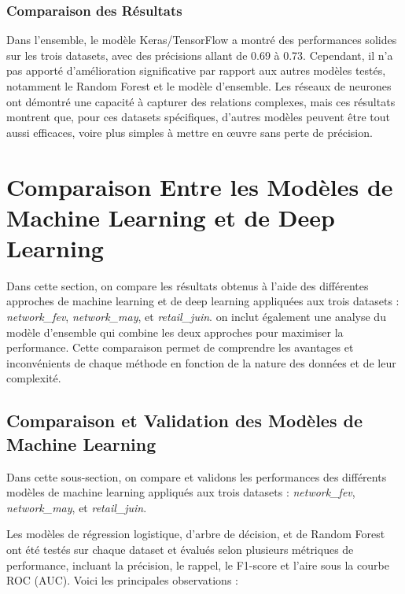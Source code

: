 \subsubsection{Comparaison des Résultats}

Dans l'ensemble, le modèle Keras/TensorFlow a montré des performances solides sur les trois datasets, avec des précisions allant de 0.69 à 0.73. Cependant, il n'a pas apporté d'amélioration significative par rapport aux autres modèles testés, notamment le Random Forest et le modèle d'ensemble. Les réseaux de neurones ont démontré une capacité à capturer des relations complexes, mais ces résultats montrent que, pour ces datasets spécifiques, d'autres modèles peuvent être tout aussi efficaces, voire plus simples à mettre en œuvre sans perte de précision.


\section{Comparaison Entre les Modèles de Machine Learning et de Deep Learning}

Dans cette section, on compare les résultats obtenus à l'aide des différentes approches de machine learning et de deep learning appliquées aux trois datasets : \textit{network\_fev}, \textit{network\_may}, et \textit{retail\_juin}. on inclut également une analyse du modèle d'ensemble qui combine les deux approches pour maximiser la performance. Cette comparaison permet de comprendre les avantages et inconvénients de chaque méthode en fonction de la nature des données et de leur complexité.

\subsection{Comparaison et Validation des Modèles de Machine Learning}

Dans cette sous-section, on compare et validons les performances des différents modèles de machine learning appliqués aux trois datasets : \textit{network\_fev}, \textit{network\_may}, et \textit{retail\_juin}. 

Les modèles de régression logistique, d'arbre de décision, et de Random Forest ont été testés sur chaque dataset et évalués selon plusieurs métriques de performance, incluant la précision, le rappel, le F1-score et l'aire sous la courbe ROC (AUC). Voici les principales observations :

